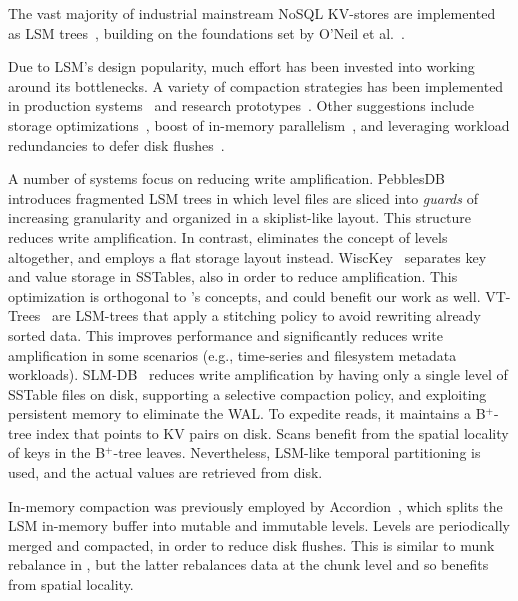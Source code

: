 

The vast majority of industrial mainstream NoSQL KV-stores are  implemented as LSM trees~\cite{hbase, 
RocksDB, scylladb, Bigtable2008, cassandra2010}, building on the foundations set by O'Neil 
et al.~\cite{DBLP:journals/acta/ONeilCGO96, Muth1998}. 

Due to LSM's design popularity, much effort has been invested into working around its bottlenecks.
A variety of compaction strategies has been implemented in production systems~\cite{CallaghanCompaction, 
ScyllaCompaction} and research prototypes~\cite{triad, PebblesDB, vttrees, slmdb}. Other suggestions include storage
optimizations~\cite{WiscKey, PebblesDB, vttrees, slmdb}, boost of in-memory parallelism~\cite{scylladb, clsm2015}, and leveraging 
 workload redundancies to defer disk flushes~\cite{triad, accordion}. 

A number of systems focus on reducing write amplification.
PebblesDB~\cite{PebblesDB} introduces fragmented LSM trees in which level files are 
sliced into {\em guards\/} of increasing granularity and organized in a skiplist-like layout. This structure 
reduces write amplification. In contrast, \sys\/ eliminates the concept of levels altogether, 
and employs a flat storage layout instead. WiscKey~\cite{WiscKey} separates key and value storage 
in SSTables, also in order to reduce amplification. This optimization is orthogonal to \sys's concepts,
and could benefit our work as well. 
VT-Trees~\cite{vttrees} are LSM-trees that apply a stitching policy to avoid rewriting already sorted data. This improves performance and significantly reduces write amplification 
in some scenarios (e.g., time-series and filesystem metadata workloads). 
SLM-DB~\cite{slmdb} reduces write amplification by having only a single level of SSTable files on disk, supporting a selective compaction policy, and
exploiting persistent memory to eliminate the WAL. To expedite reads, it maintains a B$^+$-tree index that points to KV pairs on disk. Scans benefit from the spatial locality of keys in the B$^+$-tree leaves. Nevertheless, LSM-like temporal partitioning is used, and the actual values are retrieved from disk.

In-memory compaction was previously employed by
Accordion~\cite{accordion}, which splits the LSM in-memory buffer into mutable 
and immutable levels. Levels are periodically merged and compacted, 
in order to reduce disk flushes. This is similar to munk rebalance in \sys, 
but the latter rebalances data at the chunk level and so benefits from spatial locality.



